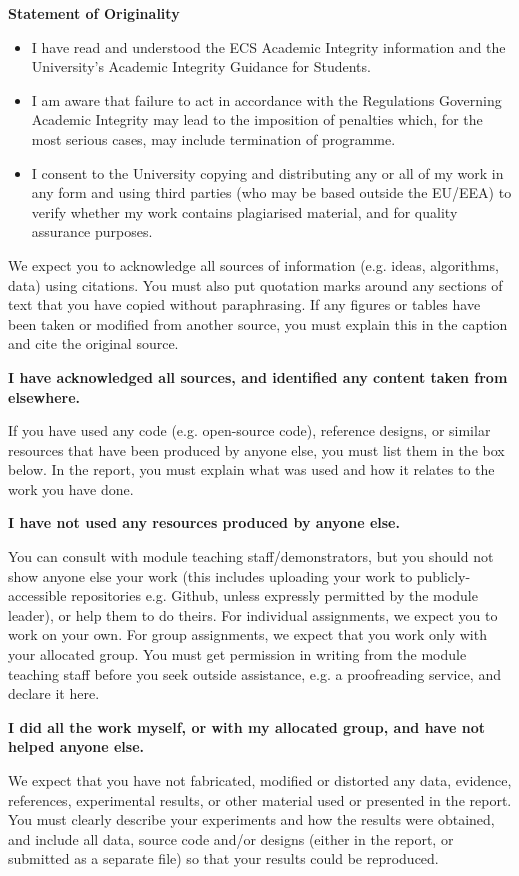 \textbf{Statement of Originality}
\begin{itemize}
    \item I have read and understood the ECS Academic Integrity information and the University’s Academic Integrity Guidance for Students.
    \item I am aware that failure to act in accordance with the Regulations Governing Academic Integrity may lead to the imposition of penalties which, for the most serious cases, may include termination of programme.
    \item I consent to the University copying and distributing any or all of my work in any form and using third parties (who may be based outside the EU/EEA) to verify whether my work contains plagiarised material, and for quality assurance purposes.
\end{itemize}

We expect you to acknowledge all sources of information (e.g. ideas, algorithms, data) using citations. You must also put quotation marks around any sections of text that you have copied without paraphrasing. If any figures or tables have been taken or modified from another source, you must explain this in the caption and cite the original source.

\textbf{I have acknowledged all sources, and identified any content taken from elsewhere.}

If you have used any code (e.g. open-source code), reference designs, or similar resources that have been produced by anyone else, you must list them in the box below. In the report, you must explain what was used and how it relates to the work you have done.

\textbf{I have not used any resources produced by anyone else.}

You can consult with module teaching staff/demonstrators, but you should not show anyone else your work (this includes uploading your work to publicly-accessible repositories e.g. Github, unless expressly permitted by the module leader), or help them to do theirs. For individual assignments, we expect you to work on your own. For group assignments, we expect that you work only with your allocated group. You must get permission in writing from the module teaching staff before you seek outside assistance, e.g. a proofreading service, and declare it here.

\textbf{I did all the work myself, or with my allocated group, and have not helped anyone else.}

We expect that you have not fabricated, modified or distorted any data, evidence, references, experimental results, or other material used or presented in the report. You must clearly describe your experiments and how the results were obtained, and include all data, source code and/or designs (either in the report, or submitted as a separate file) so that your results could be reproduced.


